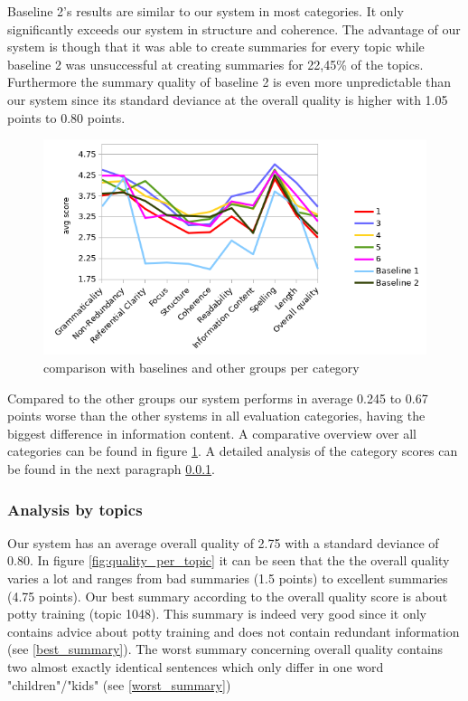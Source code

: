 Baseline 2's results are similar to our system in most categories. It only significantly exceeds our system in structure and coherence. The advantage of our system is though that it was able to create summaries for every topic while baseline 2 was unsuccessful at creating summaries for 22,45\% of the topics. Furthermore the summary quality of baseline 2 is even more unpredictable than our system since its standard deviance at the overall quality is higher with 1.05 points to 0.80 points.

\begin{figure}[!ht]
	\centering
	\label{fig:quality_per_category}
	\caption{comparison with baselines and other groups per category}
	\includegraphics[width=0.8\linewidth]{figures/quality_per_category.png}
\end{figure}  


Compared to the other groups our system performs in average 0.245 to 0.67 points worse than the other systems in all evaluation  categories, having the biggest difference in information content. A comparative overview over all categories can be found in figure \ref{fig:quality_per_category}. A detailed analysis of the category scores can be found in the next paragraph \ref{analysis_by_topics}.

\subsubsection{Analysis by topics}
\label{analysis_by_topics}

Our system has an average overall quality of 2.75 with a standard deviance of 0.80. In figure \ref{fig:quality_per_topic} it can be seen that the the overall quality varies a lot and ranges from bad summaries (1.5 points) to excellent summaries (4.75 points). Our best summary according to the overall quality score is about potty training (topic 1048). This summary is indeed very good since it only contains advice about potty training and does not contain redundant information (see \ref{best_summary}). The worst summary concerning overall quality contains two almost exactly identical sentences which only differ in one word "children"/"kids" (see \ref{worst_summary})

